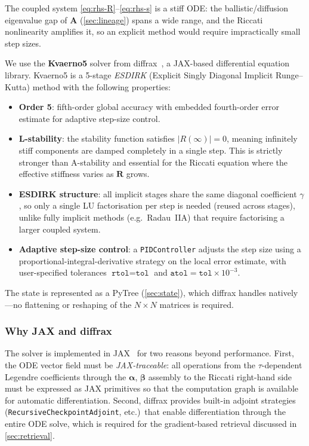 \documentclass[11pt,a4paper]{article}
\newcommand{\mat}[1]{\mathbf{#1}}
\theoremstyle{definition}
\begin{document}
The coupled system \eqref{eq:rhs-R}--\eqref{eq:rhs-s} is a stiff ODE:
the ballistic/diffusion eigenvalue gap of $\mat{A}$ (\cref{sec:lineage})
spans a wide range, and the Riccati nonlinearity amplifies it, so an
explicit method would require impractically small step sizes.

We use the \textbf{Kvaerno5} solver from diffrax~\cite{kidger2022neural},
a JAX-based differential equation library.  Kvaerno5 is a 5-stage
\emph{ESDIRK} (Explicit Singly Diagonal Implicit Runge--Kutta) method
with the following properties:
\begin{itemize}[nosep]
  \item \textbf{Order 5}: fifth-order global accuracy with embedded
    fourth-order error estimate for adaptive step-size control.
  \item \textbf{L-stability}: the stability function satisfies
    $|R(\infty)| = 0$, meaning infinitely stiff components are damped
    completely in a single step.  This is strictly stronger than
    A-stability and essential for the Riccati equation where the
    effective stiffness varies as $\mat{R}$ grows.
  \item \textbf{ESDIRK structure}: all implicit stages share the same
    diagonal coefficient $\gamma$, so only a single LU factorisation
    per step is needed (reused across stages), unlike fully implicit
    methods (e.g.\ Radau~IIA) that require factorising a larger coupled
    system.
  \item \textbf{Adaptive step-size control}: a \texttt{PIDController}
    adjusts the step size using a proportional-integral-derivative
    strategy on the local error estimate, with user-specified tolerances
    $\texttt{rtol} = \texttt{tol}$ and
    $\texttt{atol} = \texttt{tol} \times 10^{-3}$.
\end{itemize}

The state is represented as a PyTree (\cref{sec:state}), which diffrax
handles natively---no flattening or reshaping of the $N\!\times\!N$
matrices is required.

\subsubsection{Why JAX and diffrax}

The solver is implemented in JAX~\cite{jax2018github} for two reasons
beyond performance.  First, the ODE vector field must be
\emph{JAX-traceable}: all operations from the $\tau$-dependent Legendre
coefficients through the $\mat{\alpha}$, $\mat{\beta}$ assembly to the
Riccati right-hand side must be expressed as JAX primitives so that the
computation graph is available for automatic differentiation.  Second,
diffrax provides built-in adjoint strategies
(\texttt{RecursiveCheckpointAdjoint}, etc.)\ that enable differentiation
through the entire ODE solve, which is required for the gradient-based
retrieval discussed in \cref{sec:retrieval}.
\end{document}
